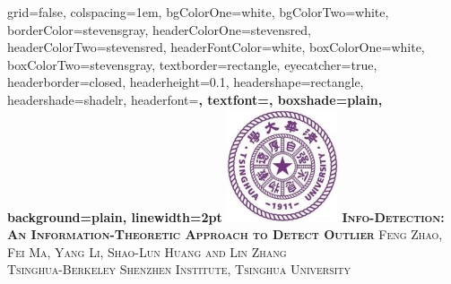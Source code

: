 \documentclass[portrait,final,a0paper,fontscale=0.3]{baposter}
\begin{document}


\begin{poster}%
  {
  grid=false,
  colspacing=1em,
  bgColorOne=white,
  bgColorTwo=white,
  borderColor=stevensgray,
  headerColorOne=stevensred,
  headerColorTwo=stevensred,
  headerFontColor=white,
  boxColorOne=white,
  boxColorTwo=stevensgray,
  textborder=rectangle,
  eyecatcher=true,
  headerborder=closed,
  headerheight=0.1\textheight,
  headershape=rectangle,
  headershade=shadelr,
  headerfont=\Large\bf\textsc, %
  textfont={\setlength{\parindent}{1.5em}},
  boxshade=plain,
  background=plain,
  linewidth=2pt
  }
  {
  		\includegraphics[height=9.0em]{thu.jpg}
  } %
  {\bf \textsc{ Info-Detection: An Information-Theoretic Approach to Detect Outlier } }
  {\textsc{  Feng Zhao, Fei Ma, Yang Li, Shao-Lun Huang and Lin Zhang \\ Tsinghua-Berkeley Shenzhen Institute, Tsinghua University}}
  {%
  }


\end{poster}
\end{document}
